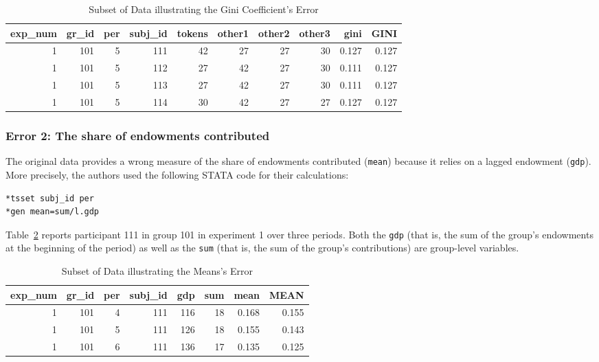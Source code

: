 \documentclass[
  authoryear,
  review,
  3p,
  onecolumn]{elsarticle}
\begin{document}
\hypertarget{tbl-gini-error}{}
\begin{table}
\caption{\label{tbl-gini-error}Subset of Data illustrating the Gini Coefficient's Error }\tabularnewline

\centering
\begin{tabular}{r|r|r|r|r|r|r|r|r|r}
\hline
exp\_num & gr\_id & per & subj\_id & tokens & other1 & other2 & other3 & gini & GINI\\
\hline
1 & 101 & 5 & 111 & 42 & 27 & 27 & 30 & 0.127 & 0.127\\
\hline
1 & 101 & 5 & 112 & 27 & 42 & 27 & 30 & 0.111 & 0.127\\
\hline
1 & 101 & 5 & 113 & 27 & 42 & 27 & 30 & 0.111 & 0.127\\
\hline
1 & 101 & 5 & 114 & 30 & 42 & 27 & 27 & 0.127 & 0.127\\
\hline
\end{tabular}
\end{table}

\hypertarget{error-2-the-share-of-endowments-contributed}{%
\subsubsection{Error 2: The share of endowments
contributed}\label{error-2-the-share-of-endowments-contributed}}

The original data provides a wrong measure of the share of endowments
contributed (\texttt{mean}) because it relies on a lagged endowment
(\texttt{gdp}). More precisely, the authors used the following STATA
code for their calculations:

\begin{verbatim}
*tsset subj_id per
*gen mean=sum/l.gdp
\end{verbatim}

Table~\ref{tbl-mean-error} reports participant 111 in group 101 in
experiment 1 over three periods. Both the \texttt{gdp} (that is, the sum
of the group's endowments at the beginning of the period) as well as the
\texttt{sum} (that is, the sum of the group's contributions) are
group-level variables.

\hypertarget{tbl-mean-error}{}
\begin{table}
\caption{\label{tbl-mean-error}Subset of Data illustrating the Means's Error }\tabularnewline

\centering
\begin{tabular}{r|r|r|r|r|r|r|r}
\hline
exp\_num & gr\_id & per & subj\_id & gdp & sum & mean & MEAN\\
\hline
1 & 101 & 4 & 111 & 116 & 18 & 0.168 & 0.155\\
\hline
1 & 101 & 5 & 111 & 126 & 18 & 0.155 & 0.143\\
\hline
1 & 101 & 6 & 111 & 136 & 17 & 0.135 & 0.125\\
\hline
\end{tabular}
\end{table}
\end{document}
